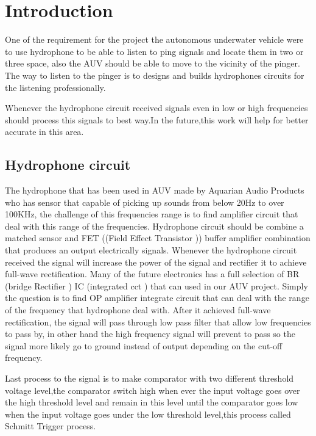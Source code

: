 \section{Introduction}\label{sec:introduction}
One of the requirement for the project the autonomous underwater vehicle were to use hydrophone to be able to listen to ping signals and locate them in two or three space, also the AUV should be able to move to the vicinity of the pinger. The way to listen to the pinger is to designs and builds hydrophones circuits for the listening professionally.
  
Whenever the hydrophone circuit received signals even in low or high frequencies should process this signals to best way.In the future,this work will help for better accurate in this area.       

\subsection{Hydrophone circuit}
The hydrophone that has been used in AUV made by Aquarian Audio Products who has sensor that capable of picking up sounds from below 20Hz to over 100KHz, the challenge of this frequencies range is to find amplifier circuit that deal with this range of the frequencies.
Hydrophone circuit should be combine a matched sensor and FET ((Field Effect Transistor )) buffer amplifier combination that produces an output electrically signals.
\newline Whenever the hydrophone circuit received the signal will increase the power of the signal and rectifier it to achieve full-wave rectification. 
Many of the future electronics has a full selection of BR (bridge Rectifier ) IC (integrated cct ) that can used in our AUV project.
\newline Simply the  question is to find OP amplifier integrate circuit that can deal with the range of the frequency that hydrophone deal with.  
After it achieved full-wave rectification, the signal will pass through low pass filter that allow low frequencies to pass by, in other hand the high frequency signal will prevent to pass so the signal more likely go to ground instead of output depending on the cut-off frequency.

Last process to the signal is to make comparator with two different threshold voltage level,the comparator switch high when ever the input voltage goes over the high threshold level and remain in this level until the comparator goes low when the input voltage goes under the low threshold level,this process called Schmitt Trigger process.
        

